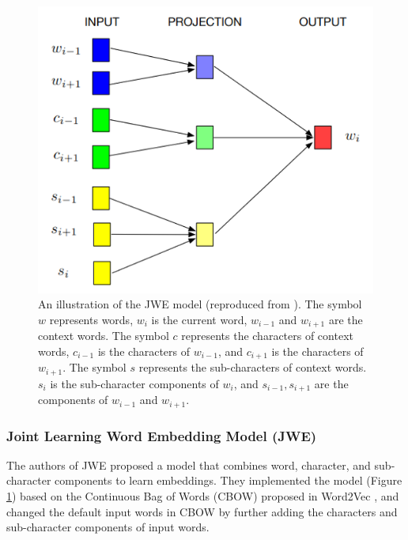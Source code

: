 \vspace{0.3cm}
\begin{figure}[h]
	\centering
	\includegraphics[scale=0.55]{../images/jwe_illustration.png}
	\caption[An illustration of the JWE model (reproduced from \cite{yu2017joint})]{An illustration of the JWE model (reproduced from \cite{yu2017joint}). The symbol $w$ represents words, $w_i$ is the current word, $w_{i-1}$ and $w_{i+1}$ are the context words. The symbol $c$ represents the characters of context words, $c_{i-1}$ is the characters of $w_{i-1}$, and $c_{i+1}$ is the characters of $w_{i+1}$. The symbol $s$ represents the sub-characters of context words. $s_i$ is the sub-character components of $w_i$, and $s_{i-1}, s_{i+1}$ are the components of $w_{i-1}$ and $w_{i+1}$.}
	\label{fig:jwe}
\end{figure}

\subsubsection{Joint Learning Word Embedding Model (JWE)}

The authors of JWE \cite{yu2017joint} proposed a model that combines word, character, and sub-character components to learn embeddings. They implemented the model (Figure \ref{fig:jwe}) based on the Continuous Bag of Words (CBOW) proposed in Word2Vec \cite{mikolov2013efficient}, and changed the default input words in CBOW by further adding the characters and sub-character components of input words.


